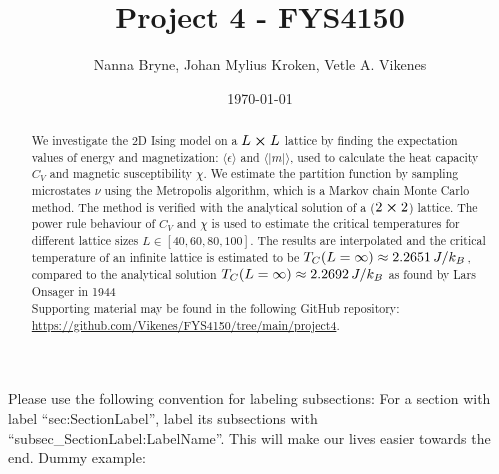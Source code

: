 



\title{Project 4 - FYS4150} 
\author{Nanna Bryne, Johan Mylius Kroken, Vetle A. Vikenes} 
\date{\today}                             
\noaffiliation                            

\begin{abstract}
    We investigate the 2D Ising model on a $L\cross L$ lattice by finding the expectation values of energy and magnetization: $\langle \epsilon \rangle$ and $\langle \vert m \vert \rangle$, used to calculate the heat capacity $C_V$ and magnetic susceptibility $\chi$. We estimate the partition function by sampling microstates $\nu$ using the Metropolis algorithm, which is a Markov chain Monte Carlo method. The method is verified with the analytical solution of a ($2\cross2$) lattice. The power rule behaviour of $C_V$ and $\chi$ is used to estimate the critical temperatures for different lattice sizes $L\in[40,60,80,100]$. The results are interpolated and the critical temperature of an infinite lattice is estimated to be $T_C(L=\infty) \approx 2.2651\,J/k_B$, compared to the analytical solution $T_C(L=\infty) \approx 2.2692\,J/k_B$ as found by Lars Onsager in 1944 \cite{Onsager_Ising2D}\\
    Supporting material may be found in the following GitHub repository: \url{https://github.com/Vikenes/FYS4150/tree/main/project4}.
\end{abstract}
\maketitle


\alert{Please use the following convention for labeling subsections: For a section with label ``sec:SectionLabel'', label its subsections with ``subsec\_SectionLabel:LabelName''. This will make our lives easier towards the end. Dummy example:}


  

   















 




